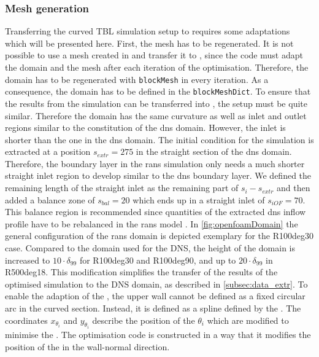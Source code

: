 
\subsubsection{Mesh generation}
Transferring the curved TBL simulation setup to  requires some adaptations which will be presented here. 
First, the mesh has to be regenerated. 
It is not possible to use a mesh created in  and transfer it to , since the code must adapt the domain and the mesh after each iteration of the optimisation.
Therefore, the domain has to be regenerated with \verb|blockMesh| in every iteration.
As a consequence, the domain has to be defined in the \verb|blockMeshDict|.
To ensure that the results from the  simulation can be transferred into , the setup must be quite similar.
Therefore the domain has the same curvature as well as  inlet and outlet regions similar to the constitution of the \acrshort{dns} domain.
However, the inlet is shorter than the one in the \acrshort{dns} domain.
The initial condition for the  simulation is extracted at a position $s_{extr} = 275$ in the straight section of the \acrshort{dns} domain.
Therefore, the boundary layer in the \acrshort{rans} simulation only needs a much shorter straight inlet region to develop similar to the \acrshort{dns} boundary layer.
We defined the remaining length of the straight inlet as the remaining part of $s_{i} - s_{extr}$ and then added a balance zone of $s_{bal} = 20$ which ends up in a straight inlet of $s_{iOF} = 70$.
This balance region is recommended since quantities of the extracted \acrshort{dns} inflow profile have to be rebalanced in the \acrshort{rans} model .
In \autoref{fig:openfoamDomain} the general configuration of the \acrshort{rans} domain is depicted exemplary for the R100deg30 case.
Compared to the domain used for the DNS, the height of the domain is increased to $10 \cdot \delta_{99}$ for R100deg30 and R100deg90, and up to $20 \cdot \delta_{99}$ in R500deg18.
This modification simplifies the transfer of the results of the optimised  simulation to the DNS domain, as  described in \autoref{subsec:data_extr}.
To enable the adaption of the , the upper wall cannot be defined as a fixed circular arc in the curved section.
Instead, it is defined as a spline defined by the .
The coordinates $x_{\theta_i}$ and $y_{\theta_i}$  describe the position of the  $\theta_i$ which are modified to minimise the .  
The optimisation code is constructed in a way that it modifies the position of the  in the wall-normal direction. 


